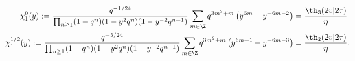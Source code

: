 \begin{equation}
  \begin{split}
     \chi_1^0(y):= {q^{-1/24} \over \prod_{n\geq 1}(1-q^n)(1-y^2
     q^n)(1-y^{-2} q^{n-1})}  \sum_{m\in\Z}
  q^{3m^2+m} \left( y^{6m} -y^{-6m-2} \right) &= {\th_3(2v|2\tau) \over
     \eta}\\
     \chi_1^{1/2}(y):= {q^{-5/24} \over \prod_{n\geq 1}(1-q^n)(1-y^2
     q^n)(1-y^{-2} q^{n-1})}  \sum_{m\in\Z}
  q^{3m^2+m} \left( y^{6m+1} -y^{-6m-3} \right)&= {\th_2(2v|2\tau) \over
     \eta}. \\
  \end{split}
\end{equation}

